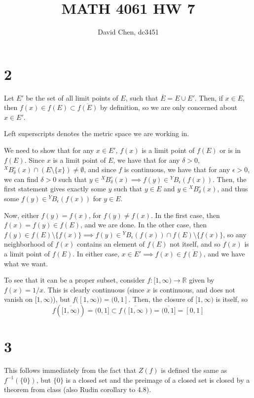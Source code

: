 \documentclass[12pt,letterpaper]{article}
\title{MATH 4061 HW 7}
\author{David Chen, dc3451}
\theoremstyle{definition}
\newcommand{\R}{\mathbb{R}}
\begin{document}
\maketitle

\section*{2}

Let $E'$ be the set of all limit points of $E$, such that $\overline{E} = E \cup E'$. Then, if $x \in E$, then $f(x) \in f(E) \subset \overline{f(E)}$ by definition, so we are only concerned about $x \in E'$.

Left superscripts denotes the metric space we are working in.

We need to show that for any $x \in E'$, $f(x)$ is a limit point of $f(E)$ or is in $f(E)$. Since $x$ is a limit point of $E$, we have that for any $\delta > 0$, ${}^{X}B_{\delta}^{\circ}(x) \cap (E \setminus \{x\}) \neq \emptyset$, and since $f$ is continuous, we have that for any $\epsilon > 0$, we can find $\delta > 0$ such that $y \in {}^{X}B_{\delta}^{\circ}(x) \implies f(y) \in {}^{Y}B_{\epsilon}(f(x))$. Then, the first statement gives exactly some $y$ such that $y \in E$ and $y \in {}^{X}B_{\delta}^{\circ}(x)$, and thus some $f(y)\in {}^{Y}B_{\epsilon}(f(x))$ for $y \in E$.

Now, either $f(y) = f(x)$, for $f(y) \neq f(x)$. In the first case, then $f(x) = f(y) \in f(E)$, and we are done. In the other case, then $f(y) \in f(E) \setminus \{f(x)\} \implies f(y) \in {}^{Y}B_{\epsilon}(f(x)) \cap f(E) \setminus \{f(x)\}$, so any neighborhood of $f(x)$ contains an element of $f(E)$ not itself, and so $f(x)$ is a limit point of $f(E)$. In either case, $x \in E' \implies f(x) \in \overline{f(E)}$, and we have what we want.

To see that it can be a proper subset, consider $f: [1, \infty) \rightarrow \R$ given by $f(x) = 1/x$. This is clearly continuous (since $x$ is continuous, and does not vanish on $[1, \infty)$), but $f([1,\infty)) = (0,1]$. Then, the closure of $[1,\infty)$ is itself, so
\[
  f(\overline{[1,\infty)}) = (0,1] \subset \overline{f([1,\infty))} = \overline{(0, 1]} = [0,1]
\]

\section*{3}

This follows immediately from the fact that $Z(f)$ is defined the same as $f^{-1}(\{0\})$, but $\{0\}$ is a closed set and the preimage of a closed set is closed by a theorem from class (also Rudin corollary to 4.8).
\end{document}
